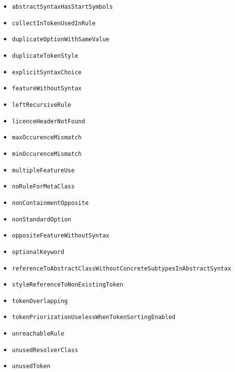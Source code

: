 \begin{itemize}
\item \texttt{abstractSyntaxHasStartSymbols}
\item \texttt{collectInTokenUsedInRule}
\item \texttt{duplicateOptionWithSameValue}
\item \texttt{duplicateTokenStyle}
\item \texttt{explicitSyntaxChoice}
\item \texttt{featureWithoutSyntax}
\item \texttt{leftRecursiveRule}
\item \texttt{licenceHeaderNotFound}
\item \texttt{maxOccurenceMismatch}
\item \texttt{minOccurenceMismatch}
\item \texttt{multipleFeatureUse}
\item \texttt{noRuleForMetaClass}
\item \texttt{nonContainmentOpposite}
\item \texttt{nonStandardOption}
\item \texttt{oppositeFeatureWithoutSyntax}
\item \texttt{optionalKeyword}
\item \texttt{referenceToAbstractClassWithoutConcreteSubtypesInAbstractSyntax}
\item \texttt{styleReferenceToNonExistingToken}
\item \texttt{tokenOverlapping}
\item \texttt{tokenPriorizationUselessWhenTokenSortingEnabled}
\item \texttt{unreachableRule}
\item \texttt{unusedResolverClass}
\item \texttt{unusedToken}
\end{itemize}
